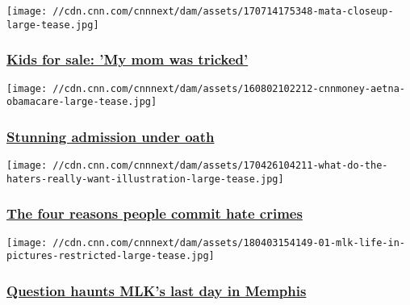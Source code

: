 \texttt{[image: //cdn.cnn.com/cnnnext/dam/assets/170714175348-mata-closeup-large-tease.jpg]}

\hypertarget{kids-for-sale-my-mom-was-tricked}{%
\subsubsection{\texorpdfstring{\href{/2017/10/12/health/uganda-adoptions-investigation-ac360/index.html}{Kids
for sale: 'My mom was
tricked'}}{Kids for sale: 'My mom was tricked'}}\label{kids-for-sale-my-mom-was-tricked}}

\href{/2018/02/11/health/aetna-california-investigation/index.html}{}

\texttt{[image: //cdn.cnn.com/cnnnext/dam/assets/160802102212-cnnmoney-aetna-obamacare-large-tease.jpg]}

\hypertarget{stunning-admission-under-oath}{%
\subsubsection{\texorpdfstring{\href{/2018/02/11/health/aetna-california-investigation/index.html}{Stunning
admission under
oath}}{Stunning admission under oath}}\label{stunning-admission-under-oath}}

\href{/2017/06/02/us/who-commits-hate-crimes/index.html}{}

\texttt{[image: //cdn.cnn.com/cnnnext/dam/assets/170426104211-what-do-the-haters-really-want-illustration-large-tease.jpg]}

\hypertarget{the-four-reasons-people-commit-hate-crimes}{%
\subsubsection{\texorpdfstring{\href{/2017/06/02/us/who-commits-hate-crimes/index.html}{The
four reasons people commit hate
crimes}}{The four reasons people commit hate crimes}}\label{the-four-reasons-people-commit-hate-crimes}}

\href{/2018/04/03/us/mlk-memphis-what-if/index.html}{}

\texttt{[image: //cdn.cnn.com/cnnnext/dam/assets/180403154149-01-mlk-life-in-pictures-restricted-large-tease.jpg]}

\hypertarget{question-haunts-mlks-last-day-in-memphis}{%
\subsubsection{\texorpdfstring{\href{/2018/04/03/us/mlk-memphis-what-if/index.html}{Question
haunts MLK's last day in
Memphis}}{Question haunts MLK's last day in Memphis}}\label{question-haunts-mlks-last-day-in-memphis}}

